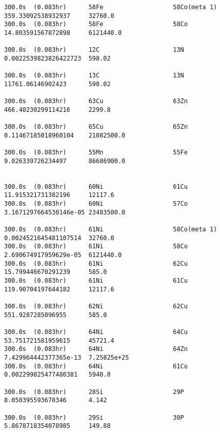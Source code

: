\begin{lstlisting}[style=sOutputFile,caption={Final results for steel irradiation},label={listing:alexsteel}]
300.0s  (0.083hr)      58Fe                   58Co(meta 1)           359.33092538932937     32760.0               
300.0s  (0.083hr)      58Fe                   58Co                   14.803591567872898     6121440.0             

300.0s  (0.083hr)      12C                    13N                    0.0022539823826422723  598.02                

300.0s  (0.083hr)      13C                    13N                    11761.06146902423      598.02                

300.0s  (0.083hr)      63Cu                   63Zn                   466.40230299114216     2299.8                

300.0s  (0.083hr)      65Cu                   65Zn                   0.11467185018960104    21082500.0            

300.0s  (0.083hr)      55Mn                   55Fe                   9.026339726234497      86686900.0            


300.0s  (0.083hr)      60Ni                   61Cu                   11.915321731382196     12117.6               
300.0s  (0.083hr)      60Ni                   57Co                   3.1671297664530146e-05 23483500.0            

300.0s  (0.083hr)      61Ni                   58Co(meta 1)           0.0024521645481107514  32760.0               
300.0s  (0.083hr)      61Ni                   58Co                   2.690674917959629e-05  6121440.0             
300.0s  (0.083hr)      61Ni                   62Cu                   15.799446670291239     585.0                 
300.0s  (0.083hr)      61Ni                   61Cu                   119.90704197644182     12117.6               

300.0s  (0.083hr)      62Ni                   62Cu                   551.9287285096955      585.0                 

300.0s  (0.083hr)      64Ni                   64Cu                   53.751721581959615     45721.4               
300.0s  (0.083hr)      64Ni                   64Zn                   7.429964442377365e-13  7.25825e+25           
300.0s  (0.083hr)      64Ni                   61Co                   0.002299825477480381   5940.0                

300.0s  (0.083hr)      28Si                   29P                    8.050395593678346      4.142                 

300.0s  (0.083hr)      29Si                   30P                    5.8678718354078985     149.88                




\end{lstlisting}
